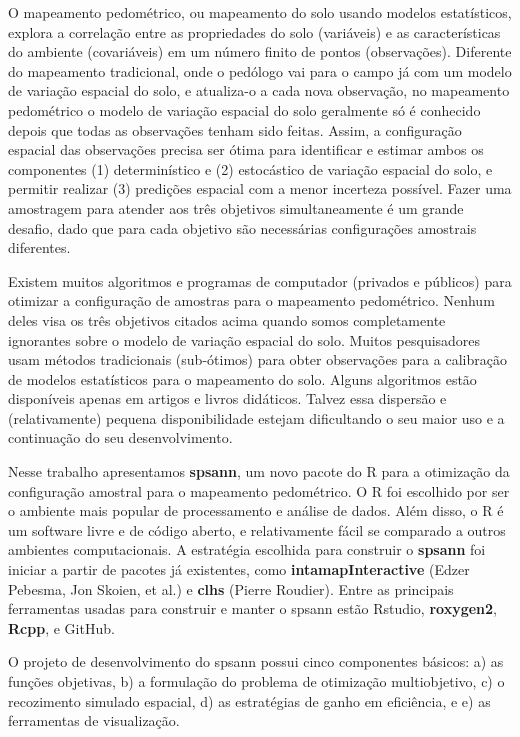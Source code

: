 O mapeamento pedométrico, ou mapeamento do solo usando modelos 
estatísticos, explora a correlação entre as propriedades do solo
(variáveis) e as características do ambiente (covariáveis) em um 
número finito de pontos (observações). Diferente do mapeamento 
tradicional, onde o pedólogo vai para o campo já com um modelo de 
variação espacial do solo, e atualiza-o a cada nova observação, no
mapeamento pedométrico o modelo de variação espacial do solo 
geralmente só é conhecido depois que todas as observações tenham sido
feitas. Assim, a configuração espacial das observações precisa ser 
ótima para identificar e estimar ambos os componentes (1) determinístico
e (2) estocástico de variação espacial do solo, e permitir realizar 
(3) predições espacial com a menor incerteza possível. Fazer uma 
amostragem para atender aos três objetivos simultaneamente é um grande
desafio, dado que para cada objetivo são necessárias configurações
amostrais diferentes.

Existem muitos algoritmos e programas de computador (privados e 
públicos) para otimizar a configuração de amostras para o mapeamento
pedométrico. Nenhum deles visa os três objetivos citados acima quando
somos completamente ignorantes sobre o modelo de variação espacial 
do solo. Muitos pesquisadores usam métodos tradicionais (sub-ótimos) 
para obter observações para a calibração de modelos estatísticos para
o mapeamento do solo. Alguns algoritmos estão disponíveis apenas em 
artigos e livros didáticos. Talvez essa dispersão e (relativamente) 
pequena disponibilidade estejam dificultando o seu maior uso e a 
continuação do seu desenvolvimento.

Nesse trabalho apresentamos \textbf{spsann}, um novo pacote do R para a
otimização da configuração amostral para o mapeamento pedométrico. 
O R foi escolhido por ser o ambiente mais popular de processamento
e análise de dados. Além disso, o R é um software livre e de código
aberto, e relativamente fácil se comparado a outros ambientes 
computacionais. A estratégia escolhida para construir o \textbf{spsann}
foi iniciar a partir de pacotes já existentes, como
\textbf{intamapInteractive} (Edzer Pebesma, Jon Skoien, et al.) e 
\textbf{clhs} (Pierre Roudier). Entre as principais ferramentas usadas 
para construir e manter o spsann estão Rstudio, \textbf{roxygen2},
\textbf{Rcpp}, e GitHub.

O projeto de desenvolvimento do spsann possui cinco componentes 
básicos: a) as funções objetivas, b) a formulação do problema de
otimização multiobjetivo, c) o recozimento simulado espacial, d) as
estratégias de ganho em eficiência, e e) as ferramentas de 
visualização.

